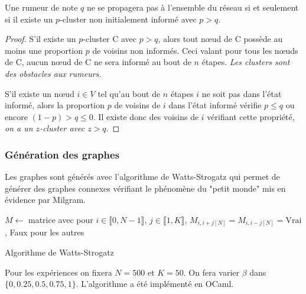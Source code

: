 \documentclass{article}
\begin{document}
\begin{theo}
  Une rumeur de note $q$ ne se propagera pas à l'ensemble du réseau si et seulement si il existe un $p$-cluster non initialement informé avec $p>q$.
\end{theo}
\begin{proof}
  S'il existe un $p$-cluster C avec $p>q$, alors tout nœud de C possède au moins une proportion $p$ de voisins non informés. Ceci valant pour tous les nœuds de C, aucun nœud de C ne sera informé au bout de $n$ étapes. \emph{Les clusters sont des obstacles aux rumeurs.}

  S'il existe un nœud $i\in V$ tel qu'au bout de $n$ étapes $i$ ne soit pas dans l'état informé, alors la proportion $p$ de voisins de $i$ dans l'état informé vérifie $p \leq q$ ou encore $(1-p) > q \leq 0$. Il existe donc des voisins de $i$ vérifiant cette propriété, \emph{on a un $z$-cluster avec $z>q$}.
\end{proof}

\subsubsection{Génération des graphes}

Les graphes sont générés avec l'algorithme de Watts-Strogatz qui permet de générer des graphes connexes vérifiant le phénomène du "petit monde" mis en évidence par Milgram.

\begin{algorithm}[H]
$M \leftarrow $ matrice avec pour $i\in \llbracket0,N-1\rrbracket$, $j\in \llbracket1,K\rrbracket$, $M_{i,i+j[N]} = M_{i,i-j[N]} = \text{Vrai}$, Faux pour les autres \;
\caption{Algorithme de Watts-Strogatz}
\end{algorithm}

Pour les expériences on fixera $N=500$ et $K=50$. On fera varier $\beta$ dans $\{0,0.25,0.5,0.75,1\}$. L'algorithme a été implémenté en OCaml.
\end{document}
